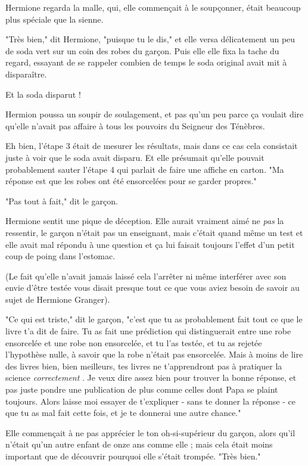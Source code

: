 Hermione regarda la malle, qui, elle commençait à le soupçonner, était beaucoup plus spéciale que la sienne.

"Très bien," dit Hermione, "puisque tu le dis," et elle versa délicatement un peu de soda vert sur un coin des robes du garçon. Puis elle elle fixa la tache du regard, essayant de se rappeler combien de temps le soda original avait mit à disparaître.

Et la soda disparut !

Hermion poussa un soupir de soulagement, et pas qu'un peu parce ça voulait dire qu'elle n'avait pas affaire à tous les pouvoirs du Seigneur des Ténèbres.

Eh bien, l'étape 3 était de mesurer les résultats, mais dans ce cas cela consistait juste à voir que le soda avait disparu. Et elle présumait qu'elle pouvait probablement sauter l'étape 4 qui parlait de faire une affiche en carton. "Ma réponse est que les robes ont été ensorcelées pour se garder propres."

"Pas tout à fait," dit le garçon.

Hermione sentit une pique de déception. Elle aurait vraiment aimé ne \emph{pas}  la ressentir, le garçon n'était pas un enseignant, mais c'était quand même un test et elle avait mal répondu à une question et ça lui faisait toujours l'effet d'un petit coup de poing dans l'estomac.

(Le fait qu'elle n'avait jamais laissé cela l'arrêter ni même interférer avec son envie d'être testée vous disait presque tout ce que vous aviez besoin de savoir au sujet de Hermione Granger).

"Ce qui est triste," dit le garçon, "c'est que tu as probablement fait tout ce que le livre t'a dit de faire. Tu as fait une prédiction qui distinguerait entre une robe ensorcelée et une robe non ensorcelée, et tu l'as testée, et tu as rejetée l'hypothèse nulle, à savoir que la robe n'était pas ensorcelée. Mais à moins de lire des livres bien, bien meilleurs, tes livres ne t'apprendront pas à pratiquer la science \emph{correctement} . Je veux dire assez bien pour trouver la bonne réponse, et pas juste pondre une publication de plus comme celles dont Papa se plaint toujours. Alors laisse moi essayer de t'expliquer - sans te donner la réponse - ce que tu as mal fait cette fois, et je te donnerai une autre chance."

Elle commençait à ne pas apprécier le ton oh-si-supérieur du garçon, alors qu'il n'était qu'un autre enfant de onze ans comme elle ; mais cela était moins important que de découvrir pourquoi elle s'était trompée. "Très bien."

